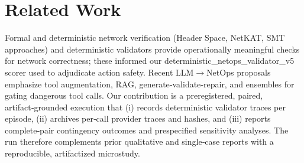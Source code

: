 \documentclass[conference]{IEEEtran}
\begin{document}
\section{Related Work}
Formal and deterministic network verification (Header Space, NetKAT, SMT approaches) and deterministic validators provide operationally meaningful checks for network correctness; these informed our deterministic\_netops\_validator\_v5 scorer used to adjudicate action safety. Recent LLM\ensuremath{\rightarrow}NetOps proposals emphasize tool augmentation, RAG, generate‑validate‑repair, and ensembles for gating dangerous tool calls. Our contribution is a preregistered, paired, artifact‑grounded execution that (i) records deterministic validator traces per episode, (ii) archives per‑call provider traces and hashes, and (iii) reports complete‑pair contingency outcomes and prespecified sensitivity analyses. The run therefore complements prior qualitative and single‑case reports with a reproducible, artifactized microstudy.
\end{document}
